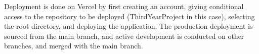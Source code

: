Deployment is done on Vercel by first creating an account, giving conditional access to the repository to be deployed (ThirdYearProject in this case), selecting the root directory, and deploying the application. The production deployment is sourced from the main branch, and active development is conducted on other branches, and merged with the main branch.